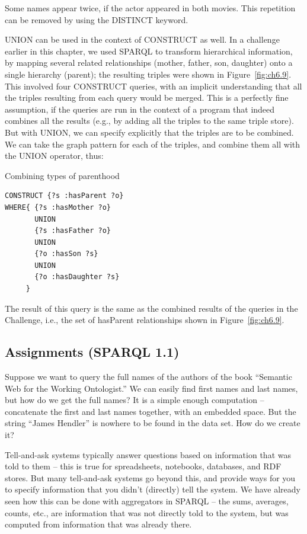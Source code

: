 Some names appear twice, if the actor appeared in both movies. This
repetition can be removed by using the DISTINCT keyword.

UNION can be used in the context of CONSTRUCT as well. In a challenge
earlier in this chapter, we used SPARQL to transform hierarchical
information, by mapping several related relationships (mother, father,
son, daughter) onto a single hierarchy (parent); the resulting triples
were shown in Figure~\ref{fig:ch6.9}. This involved four CONSTRUCT queries, with an
implicit understanding that all the triples resulting from each query
would be merged. This is a perfectly fine assumption, if the queries are
run in the context of a program that indeed combines all the results
(e.g., by adding all the triples to the same triple store). But with
UNION, we can specify explicitly that the triples are to be combined. We
can take the graph pattern for each of the triples, and combine them all
with the UNION operator, thus:

\begin{query}Combining types of parenthood\end{query}
\begin{lstlisting}
CONSTRUCT {?s :hasParent ?o}
WHERE{ {?s :hasMother ?o}
       UNION
       {?s :hasFather ?o}
       UNION
       {?o :hasSon ?s}
       UNION
       {?o :hasDaughter ?s}
     }
\end{lstlisting}

The result of this query is the same as the combined results of the
queries in the Challenge, i.e., the set of hasParent relationships shown
in Figure~\ref{fig:ch6.9}.

\subsection{Assignments (SPARQL 1.1)}
\label{assignments}

Suppose we want to query the full names of the authors of the book
``Semantic Web for the Working Ontologist.'' We can easily find first
names and last names, but how do we get the full names? It is a simple
enough computation -- concatenate the first and last names together,
with an embedded space. But the string ``James Hendler'' is nowhere to
be found in the data set. How do we create it?

Tell-and-ask systems typically answer questions based on information
that was told to them -- this is true for spreadsheets, notebooks,
databases, and RDF stores. But many tell-and-ask systems go
beyond this, and provide ways for you to specify information that you
didn't (directly) tell the system. We have already seen how this can be
done with aggregators in SPARQL -- the sums, averages, counts, etc., are
information that was not directly told to the system, but was computed
from information that was already there.

